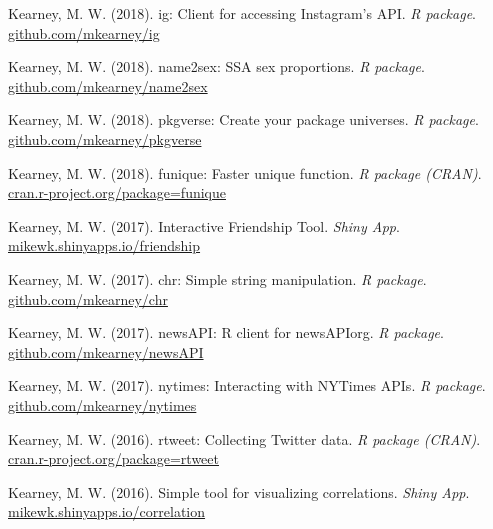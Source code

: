 \begin{bibenum}
  \item Kearney, M. W. (2018).
    ig: Client for accessing Instagram's API.
    \textit{R package}.
    \href{https://github.com/mkearney/ig}{github.com/mkearney/ig}

  \item Kearney, M. W. (2018).
    name2sex: SSA sex proportions.
    \textit{R package}.
    \href{https://github.com/mkearney/name2sex}{github.com/mkearney/name2sex}

  \item Kearney, M. W. (2018).
    pkgverse: Create your package universes.
    \textit{R package}.
    \href{https://github.com/mkearney/pkgverse}{github.com/mkearney/pkgverse}

  \item Kearney, M. W. (2018).
    funique: Faster unique function.
    \textit{R package (CRAN)}.
    \href{http://cran.r-project.org/package=funique}{cran.r-project.org/package=funique}

  \item Kearney, M. W. (2017).
    Interactive Friendship Tool.
    \textit{Shiny App}.
    \href{https://mikewk.shinyapps.io/friendship/}{mikewk.shinyapps.io/friendship}

  \item Kearney, M. W. (2017).
    chr: Simple string manipulation.
    \textit{R package}.
    \href{https://github.com/mkearney/chr}{github.com/mkearney/chr}

  \item Kearney, M. W. (2017).
    newsAPI: R client for newsAPIorg.
    \textit{R package}.
    \href{https://github.com/mkearney/newsAPI}{github.com/mkearney/newsAPI}

  \item Kearney, M. W. (2017).
    nytimes: Interacting with NYTimes APIs.
    \textit{R package}.
    \href{https://github.com/mkearney/nytimes}{github.com/mkearney/nytimes}

  \item Kearney, M. W. (2016).
    rtweet: Collecting Twitter data.
    \textit{R package (CRAN)}.
    \href{http://cran.r-project.org/package=rtweet}{cran.r-project.org/package=rtweet}

  \item Kearney, M. W. (2016).
    Simple tool for visualizing correlations.
    \textit{Shiny App}.
    \href{https://mikewk.shinyapps.io/correlation/}{mikewk.shinyapps.io/correlation}

\end{bibenum}
